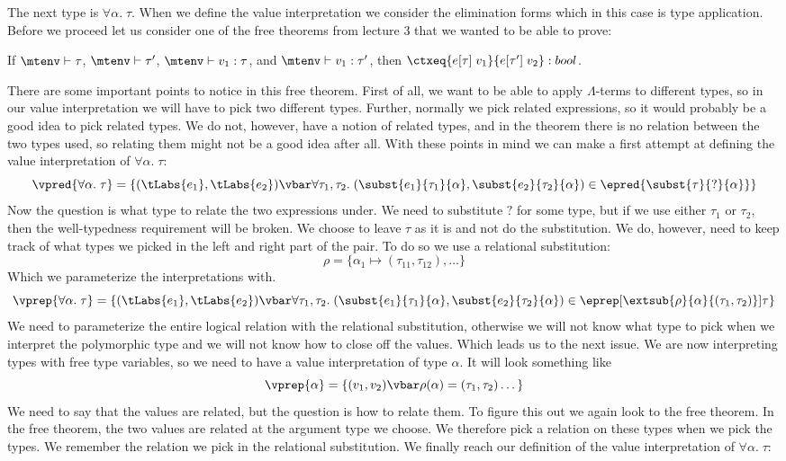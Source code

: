 The next type is $\forall \alpha. \; \tau$. When we define the value interpretation we consider the elimination forms which in this case is type application. Before we proceed let us consider one of the free theorems from lecture 3 that we wanted to be able to prove:
\begin{theorem}
  If $\mtenv \vdash \tau$,
  $\mtenv \vdash \tau'$,
  $\mtenv \vdash v_1 : \tau$,
  and $\mtenv \vdash v_1 : \tau'$,
  then $\ctxeq{e[\tau]\; v_1}{e[\tau']\; v_2} : bool$.
\end{theorem}
There are some important points to notice in this free theorem. First
of all, we want to be able to apply $\Lambda$-terms to different
types, so in our value interpretation we will have to pick two
different types. Further, normally we pick related expressions, so it
would probably be a good idea to pick related types. We do not, however, have a notion of related types, and in the theorem there is no relation between the two types used, so relating them might not be a good idea after all. With these points in mind we can make a first attempt at defining the value interpretation of $\forall \alpha. \; \tau$:
\[
  \vpred{\forall \alpha. \; \tau} = \{(\tLabs{e_1}, \tLabs{e_2}) \vbar \forall \tau_1,\tau_2. \; (\subst{e_1}{\tau_1}{\alpha},\subst{e_2}{\tau_2}{\alpha}) \in \epred{\subst{\tau}{?}{\alpha}} \}
  \]
Now the question is what type to relate the two expressions under. We need to substitute $?$ for some type, but if we use either $\tau_1$ or $\tau_2$, then the well-typedness requirement will be broken. We choose to leave $\tau$ as it is and not do the substitution. We do, however, need to keep track of what types we picked in the left and right part of the pair. To do so we use a relational substitution:
\[
  \rho = \{ \alpha_1 \mapsto (\tau_{11},\tau_{12} ), \dots \}
\]
Which we parameterize the interpretations with.
\[
  \vprep{\forall \alpha.\; \tau} = \{(\tLabs{e_1},\tLabs{e_2}) \vbar \forall \tau_1 , \tau_2. \; (\subst{e_1}{\tau_1}{\alpha},\subst{e_2}{\tau_2}{\alpha}) \in \eprep[\extsub{\rho}{\alpha}{(\tau_1,\tau_2)}]{\tau} \}
\]
We need to parameterize the entire logical relation with the relational substitution, otherwise we will not know what type to pick when we interpret the polymorphic type and we will not know how to close off the values. Which leads us to the next issue. We are now interpreting types with free type variables, so we need to have a value interpretation of type $\alpha$. It will look something like
\[
\vprep{\alpha} = \{(v_1,v_2) \vbar \rho(\alpha) = (\tau_1,\tau_2) \dots\}
\]
We need to say that the values are related, but the question is how to relate them. To figure this out we again look to the free theorem. In the free theorem, the two values are related at the argument type we choose. We therefore pick a relation on these types when we pick the types. We remember the relation we pick in the relational substitution. We finally reach our definition of the value interpretation of $\forall \alpha. \; \tau$:
